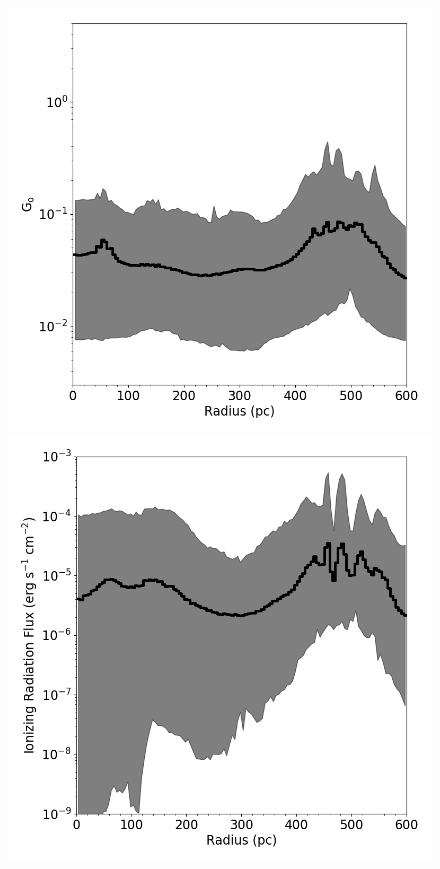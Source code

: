 \documentclass[twocolumn]{aastex61}
\begin{document}
\begin{figure}
\includegraphics[width=0.95\linewidth]{G_o_profile} \\
\includegraphics[width=0.95\linewidth]{ionizing_photon_profile}
\caption{
}
\end{figure}
\end{document}
